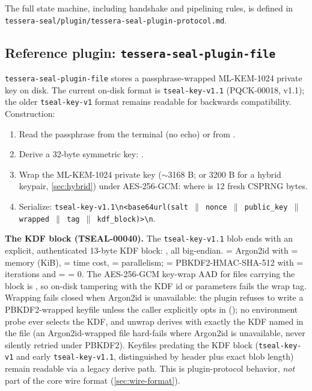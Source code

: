 The full state machine, including handshake and pipelining rules, is defined in \texttt{tessera-seal/plugin/tessera-seal-plugin-protocol.md}.

\subsection{Reference plugin: \texttt{tessera-seal-plugin-file}}
\label{sec:plugin-protocol:reference}

\texttt{tessera-seal-plugin-file} stores a passphrase-wrapped ML-KEM-1024 private key on disk. The current on-disk format is \texttt{tseal-key-v1.1} (PQCK-00018, v1.1); the older \texttt{tseal-key-v1} format remains readable for backwards compatibility. Construction:

\begin{enumerate}
\item Read the passphrase from the terminal (no echo) or from .
\item Derive a 32-byte symmetric key:  \citep{rfc9106}.
\item Wrap the ML-KEM-1024 private key ($\sim$3168 B; or 3200 B for a hybrid keypair, \cref{sec:hybrid}) under AES-256-GCM:  where  is 12 fresh CSPRNG bytes.
\item Serialize: \texttt{tseal-key-v1.1\textbackslash{}n\textless{}base64url(salt $\|$ nonce $\|$ public\_key $\|$ wrapped $\|$ tag $\|$ kdf\_block)\textgreater\textbackslash{}n}.
\end{enumerate}

\textbf{The KDF block (TSEAL-00040).} The \texttt{tseal-key-v1.1} blob ends with an explicit, authenticated 13-byte KDF block: , all big-endian.  = Argon2id with  = memory (KiB),  = time cost,  = parallelism;  = PBKDF2-HMAC-SHA-512 with  = iterations and  =  = 0. The AES-256-GCM key-wrap AAD for files carrying the block is , so on-disk tampering with the KDF id or parameters fails the wrap tag. Wrapping fails closed when Argon2id is unavailable: the plugin refuses to write a PBKDF2-wrapped keyfile unless the caller explicitly opts in (); no environment probe ever selects the KDF, and unwrap derives with exactly the KDF named in the file (an Argon2id-wrapped file hard-fails where Argon2id is unavailable, never silently retried under PBKDF2). Keyfiles predating the KDF block (\texttt{tseal-key-v1} and early \texttt{tseal-key-v1.1}, distinguished by header plus exact blob length) remain readable via a legacy derive path. This is plugin-protocol behavior, \emph{not} part of the core wire format (\cref{sec:wire-format}).

